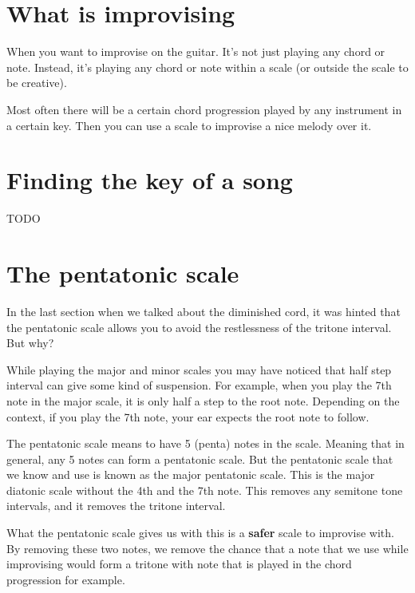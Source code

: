 \section{What is improvising}

When you want to improvise on the guitar. It's not just playing any chord or note. Instead, it's playing any chord or note within a scale (or outside the scale to be creative).

Most often there will be a certain chord progression played by any instrument in a certain key. Then you can use a scale to improvise a nice melody over it.

\section{Finding the key of a song}

TODO

\section{The pentatonic scale}

In the last section when we talked about the diminished cord, it was hinted that the pentatonic scale allows you to avoid the restlessness of the tritone interval. But why?

While playing the major and minor scales you may have noticed that half step interval can give some kind of suspension. For example, when you play the 7th note in the major scale, it is only half a step to the root note. Depending on the context, if you play the 7th note, your ear expects the root note to follow.

The pentatonic scale means to have 5 (penta) notes in the scale. Meaning that in general, any 5 notes can form a pentatonic scale. But the pentatonic scale that we know and use is known as the major pentatonic scale. This is the major diatonic scale without the 4th and the 7th note. This removes any semitone tone intervals, and it removes the tritone interval.


What the pentatonic scale gives us with this is a \textbf{safer} scale to improvise with. By removing these two notes, we remove the chance that a note that we use while improvising would form a tritone with note that is played in the chord progression for example.

